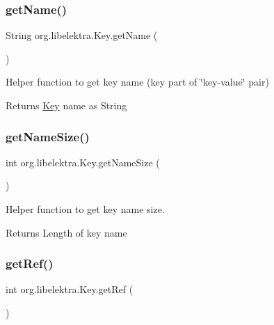 \subsubsection{\texorpdfstring{get\+Name()}{getName()}}
{\footnotesize\ttfamily String org.\+libelektra.\+Key.\+get\+Name (\begin{DoxyParamCaption}{ }\end{DoxyParamCaption})\hspace{0.3cm}{\ttfamily [inline]}}



Helper function to get key name (key part of \char`\"{}key-\/value\char`\"{} pair) 

\begin{DoxyReturn}{Returns}
\hyperlink{classorg_1_1libelektra_1_1Key}{Key} name as String 
\end{DoxyReturn}
\mbox{\label{classorg_1_1libelektra_1_1Key_aa6477bb5eb12f739858f285650816cc6}} 
\subsubsection{\texorpdfstring{get\+Name\+Size()}{getNameSize()}}
{\footnotesize\ttfamily int org.\+libelektra.\+Key.\+get\+Name\+Size (\begin{DoxyParamCaption}{ }\end{DoxyParamCaption})\hspace{0.3cm}{\ttfamily [inline]}}



Helper function to get key name size. 

\begin{DoxyReturn}{Returns}
Length of key name 
\end{DoxyReturn}
\mbox{\label{classorg_1_1libelektra_1_1Key_a3672b9c763ac97d78317b3d54a370107}} 
\subsubsection{\texorpdfstring{get\+Ref()}{getRef()}}
{\footnotesize\ttfamily int org.\+libelektra.\+Key.\+get\+Ref (\begin{DoxyParamCaption}{ }\end{DoxyParamCaption})\hspace{0.3cm}{\ttfamily [inline]}}



